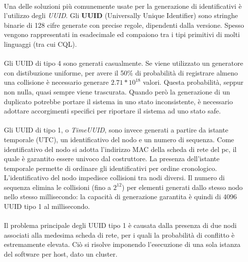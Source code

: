\documentclass[11pt,a4paper,english]{article}
\begin{document}
\paragraph{} Una delle soluzioni più comunemente usate per la generazione di identificativi è l'utilizzo degli \emph{UUID}\cite{uuid}. Gli \textbf{UUID} (Universally Unique Identifier) sono stringhe binarie di 128 cifre generate con precise regole, dipendenti dalla versione. Spesso vengono rappresentati in esadecimale ed compaiono tra i tipi primitivi di molti linguaggi (tra cui CQL).

\paragraph{} Gli UUID di tipo 4 sono generati casualmente. Se viene utilizzato un generatore con distibuzione uniforme, per avere il 50\% di probabilità di registrare almeno una collisione è necessario generare $2.71*10^{18}$ valori. Questa probabilità, seppur non nulla, quasi sempre viene trascurata. Quando però la generazione di un duplicato potrebbe portare il sistema in uno stato inconsistente, è necessario adottare accorgimenti specifici per riportare il sistema ad uno stato safe. 

\paragraph{} Gli UUID di tipo 1, o \emph{TimeUUID}, sono invece generati a partire da istante temporale (UTC), un identificativo del nodo e un numero di sequenza. Come identificativo del nodo si adotta l'indirizzo MAC della scheda di rete del pc, il quale è garantito essere univoco dal costruttore. La presenza dell'istante temporale permette di ordinare gli identificativi per ordine cronologico. L'identificativo del nodo impedisce collisioni tra nodi diversi. Il numero di sequenza elimina le collisioni (fino a $2^{12}$) per elementi generati dallo stesso nodo nello stesso millisecondo: la capacità di generazione garantita è quindi di 4096 UUID tipo 1 al millisecondo. 

\paragraph{} Il problema principale degli UUID tipo 1 è causata dalla presenza di due nodi associati alla medesima scheda di rete, per i quali la probabilità di conflitto è estremamente elevata. Ciò si risolve imponendo l'esecuzione di una sola istanza del software per host, dato un cluster.   
\end{document}
